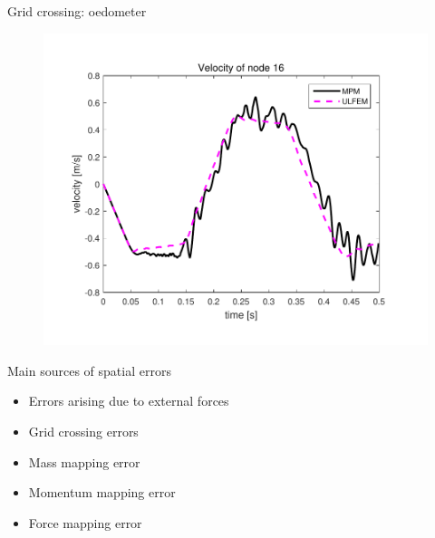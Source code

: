 \documentclass[mathserif,professionalfont,hyperref={pdfpagelabels=false}]{beamer}
\begin{document}

\begin{frame}{Grid crossing: oedometer}
\begin{figure}
\includegraphics[scale=0.5]{images/oedometer_vel_30_10}
\end{figure}
\end{frame}



\begin{frame}{Main sources of spatial errors}
\begin{tcolorbox}[colback=blue!5,colframe=blue!40!black,title=Presented today]
\begin{itemize}
\item Errors arising due to external forces
\item Grid crossing errors
\end{itemize}
\end{tcolorbox}
\begin{tcolorbox}[colback=red!5,colframe=red!50!black,title=Other sources\footnotemark]
\begin{itemize}
\item Mass mapping error
\item Momentum mapping error
\item Force mapping error
\end{itemize}
\end{tcolorbox}
\end{frame}
\end{document}
